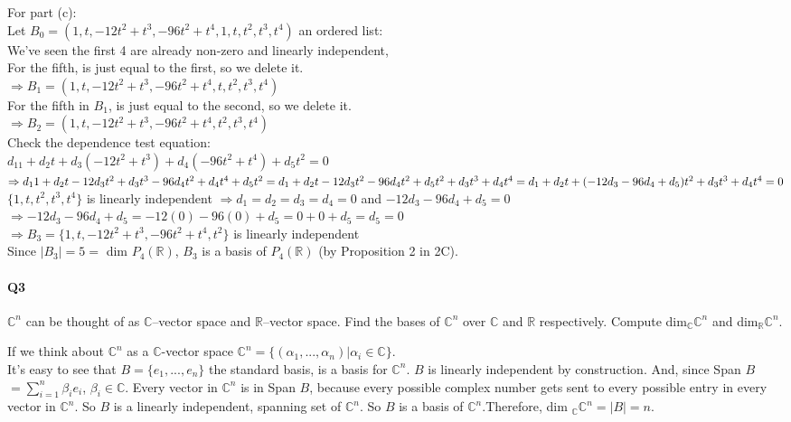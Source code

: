 \documentclass{article}
\begin{document}
For part (c):\\
Let $B_0=(1,t,-12t^2+t^3,-96t^2+t^4,1,t,t^2,t^3,t^4)$ an ordered list:\\
We've seen the first 4 are already non-zero and linearly
independent,\\
For the fifth, is just equal to the first, so we delete it.\\
$\Rightarrow B_1= (1,t,-12t^2+t^3,-96t^2+t^4,t,t^2,t^3,t^4)$\\
For the fifth in $B_1$, is just equal to the second, so we delete it.\\
$\Rightarrow B_2= (1,t,-12t^2+t^3,-96t^2+t^4,t^2,t^3,t^4)$\\
Check the dependence test equation:\\
$d_11+d_2t+d_3(-12t^2+t^3)+d_4(-96t^2+t^4) +d_5t^2=0$\\
$\Rightarrow d_11+d_2t -12d_3t^2 +d_3t^3 -96d_4t^2 + d_4t^4 +d_5t^2 =\\
d_1 + d_2t -12d_3t^2  -96d_4t^2 +d_5t^2 +d_3t^3 + d_4t^4 =\\
d_1 + d_2t +(-12d_3 -96d_4 +d_5)t^2 +d_3t^3 + d_4t^4 = 0 $\\
$\{1,t,t^2,t^3,t^4\}$ is linearly independent $\Rightarrow d_1 = d_2 =
d_3 = d_4=0$ and $-12d_3 -96d_4 +d_5 =0$\\
$\Rightarrow -12d_3 -96d_4+ d_5 = -12(0) -96(0) +d_5 = 0+0+d_5=d_5=0$\\
$\Rightarrow B_3=\{1,t,-12t^2+t^3,-96t^2+t^4,t^2\}$ is linearly independent\\
Since $|B_3| = 5 =$ dim $P_4(\mathbb{R})$, $B_3$ is a basis of
$P_4(\mathbb{R})$ (by Proposition 2 in 2C).\\
\newpage
\paragraph{Q3} $\mathbb{C}^n$ can be thought of as $\mathbb{C}$–vector space and $\mathbb{R}$–vector space. Find the
bases of $\mathbb{C}^n$ over $\mathbb{C}$ and $\mathbb{R}$
respectively. Compute dim$_{\mathbb{C}}\mathbb{C}^n$  and
dim$_{\mathbb{R}}\mathbb{C}^n$.

If we think about $\mathbb{C}^n$ as a $\mathbb{C}$-vector space
$\mathbb{C}^n=\{(\alpha_1, ... ,\alpha_n)| \alpha_i \in \mathbb{C}\}$.\\
It's easy to see that $B = \{e_1, ... ,e_n\}$ the standard basis, is a basis for
$\mathbb{C}^n$. $B$ is linearly independent by construction. And,
since Span
$B$ $= \sum_{i=1}^n \beta_ie_i$, $\beta_i \in \mathbb{C}$. Every vector in
$\mathbb{C}^n$ is in Span $B$, because every possible complex number gets sent
to every possible entry in every vector in $\mathbb{C}^n$. So $B$ is a
linearly independent, spanning set of $\mathbb{C}^n$.  So $B$ is a
basis of $\mathbb{C}^n$.Therefore, dim
$_{\mathbb{C}}\mathbb{C}^n$$=|B|=n$.
\end{document}
